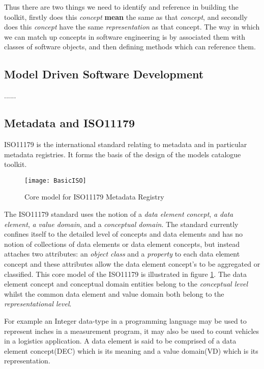 Thus there are two things we need to identify and reference in building the toolkit, firstly does this \emph{concept} \textbf{mean} the same as that \emph{concept}, and secondly does this \emph{concept} have the same \emph{representation} as that concept. The way in which we can match up concepts in software engineering is by associated them with classes of software objects, and then defining methods which can reference them. 

\subsection{Model Driven Software Development}
......



\subsection{Metadata and ISO11179}
ISO11179 is the international standard relating to metadata and in particular metadata registries. It forms the basis of the design of the models catalogue toolkit.

\begin{figure}[here]
	\texttt{[image: BasicISO]}
	\caption{Core model for ISO11179 Metadata Registry} 
	\label{fig:basicMDR}
\end{figure}

The ISO11179 standard uses the notion of a \emph{data element concept}, \emph{a data element}, \emph{a value domain}, and a \emph{conceptual domain}. The standard currently confines itself to the detailed level of concepts and data elements and has no notion of collections of data elements or data element concepts, but instead attaches two attributes: an \emph{object class} and a \emph{property} to each data element concept and these attributes allow the data element concept's to be aggregated or classified. This core model of the ISO11179 is illustrated in figure \ref{fig:basicMDR}. The data element concept and conceptual domain entities belong to the \emph{conceptual level}  whilst the common data element and value domain both belong to the \emph{representational level}.


For example an Integer data-type in a programming language may be used to represent inches in a measurement program, it may also be used to count vehicles in a logistics application.  A data element is said to be comprised of a data element concept(DEC) which is its meaning and a value domain(VD) which is its representation.

